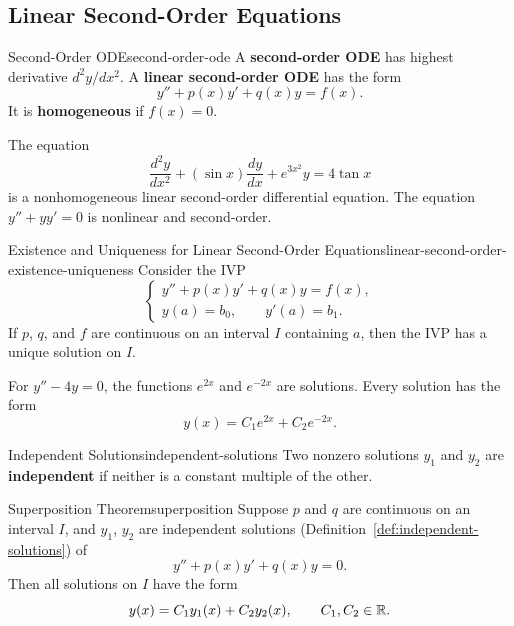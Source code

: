 \subsection{Linear Second-Order Equations}

\begin{definition}{Second-Order ODE}{second-order-ode}
  A \textbf{second-order ODE} has highest derivative $d^2y/dx^2$.
  A \textbf{linear second-order ODE} has the form
  \[
    y''+p(x)y'+q(x)y=f(x).
  \]
  It is \textbf{homogeneous} if $f(x)=0$.
\end{definition}

\begin{example}
  The equation
  \[
    \frac{d^2y}{dx^2}+(\sin x)\frac{dy}{dx}+e^{3x^2}y=4\tan x
  \]
  is a nonhomogeneous linear second-order differential equation.
  The equation $y''+yy'=0$ is nonlinear and second-order.
\end{example}

\begin{theorem}{Existence and Uniqueness for Linear Second-Order Equations}{linear-second-order-existence-uniqueness}
  Consider the IVP
  \[
    \begin{cases}
      y''+p(x)y'+q(x)y=f(x), \\
      y(a)=b_0,\qquad y'(a)=b_1.
    \end{cases}
  \]
  If $p$, $q$, and $f$ are continuous on an interval $I$ containing $a$,
  then the IVP has a unique solution on $I$.
\end{theorem}

\begin{example}
  For $y''-4y=0$, the functions $e^{2x}$ and $e^{-2x}$ are solutions.
  Every solution has the form
  \[
    y(x)=C_1e^{2x}+C_2e^{-2x}.
  \]
\end{example}

\begin{definition}{Independent Solutions}{independent-solutions}
  Two nonzero solutions $y_1$ and $y_2$ are \textbf{independent} if neither
  is a constant multiple of the other.
\end{definition}

\begin{theorem}{Superposition Theorem}{superposition}
  Suppose $p$ and $q$ are continuous on an interval $I$, and $y_1$, $y_2$
  are independent solutions (Definition~\ref{def:independent-solutions}) of
  \[
    y''+p(x)y'+q(x)y=0.
  \]
  Then all solutions on $I$ have the form
  \[
    y(x)=C_1y_1(x)+C_2y_2(x),\qquad C_1,C_2\in\mathbb{R}.
  \]
\end{theorem}

